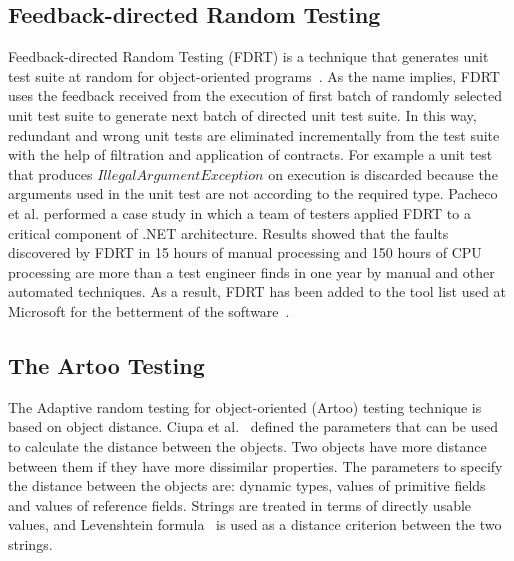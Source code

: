 
\subsection{Feedback-directed Random Testing}
Feedback-directed Random Testing (FDRT) is a technique that generates unit test suite at random for object-oriented programs~\cite{pacheco2007randoop}. As the name implies, FDRT uses the feedback received from the execution of first batch of randomly selected unit test suite to generate next batch of directed unit test suite. In this way, redundant  and wrong unit tests are eliminated incrementally from the test suite with the help of filtration and application of contracts. For example a unit test that produces $IllegalArgumentException$ on execution is discarded because the arguments used in the unit test are not according to the required type. Pacheco et al. performed a case study in which a team of testers applied FDRT to a critical component of .NET architecture. Results showed that the faults discovered by FDRT in 15 hours of manual processing and 150 hours of CPU processing are more than a test engineer finds in one year by manual and other automated techniques. As a result, FDRT has been added to the tool list used at Microsoft for the betterment of the software~\cite{pacheco2008finding}. 



\subsection{The Artoo Testing}
The Adaptive random testing for object-oriented (Artoo) testing technique is based on object distance. Ciupa et al.~\cite{ciupa2006object} defined the parameters that can be used to calculate the distance between the objects. Two objects have more distance between them if they have more dissimilar properties. The parameters to specify the distance between the objects are: dynamic types, values of primitive fields and values of reference fields. Strings are treated in terms of directly usable values, and Levenshtein formula~\cite{levenshtein1966binary} is used as a distance criterion between the two strings.


